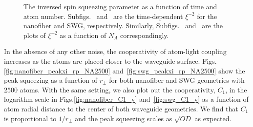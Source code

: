\documentclass[aps,pra,twocolumn,superscriptaddress]{revtex4-1} %
\begin{document}
\begin{figure}[htb]
\centering
 \begin{minipage}[h]{0.99\linewidth}
    \hfill
   \end{minipage}\vfill
   \begin{minipage}[h]{0.99\linewidth}
       \hfill
   \end{minipage}
\caption{The inversed spin squeezing parameter as a function of time and atom number. Subfigs.~\protect{} and~\protect{} are the time-dependent $ \xi^{-2} $ for the nanofiber and SWG, respectively. Similarly, Subfigs.~\protect{} and~\protect{} are the plots of $ \xi^{-2} $ as a function of $ N_A $ correspondingly. }\label{fig:xi_rpfix_NA_t}
\end{figure}

{\color{red} In the absence of any other noise, the cooperativity of atom-light coupling increases as the atoms are placed closer to the waveguide surface. Figs.\ref{fig:nanofiber_peakxi_rp_NA2500} and~\ref{fig:swg_peakxi_rp_NA2500} show the peak squeezing  as a function of $ r\!_\perp $ for both nanofiber and SWG geometries with $2500$ atoms. With the same setting, we also plot out the cooperativity, $ C_1 $, in the logarithm scale in Figs.\ref{fig:nanofiber_C1_y} and~\ref{fig:swg_C1_y} as a function of atom radial distance to the center of both waveguide geometries. We find that $C_1$ is proportional to $ 1/r\!_\perp $ and the peak squeezing scales as $ \sqrt{OD} $ as expected. }
\end{document}
